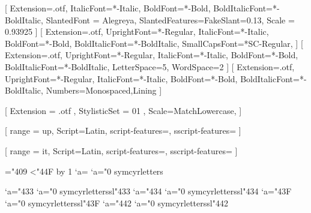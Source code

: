 % 
%


\setmainfont{Alegreya}[
  Extension=.otf,
  ItalicFont=*-Italic,
  BoldFont=*-Bold,
  BoldItalicFont=*-BoldItalic,
  SlantedFont = Alegreya,
  SlantedFeatures={FakeSlant=0.13},
  Scale = 0.93925
]
\setsansfont{AlegreyaSans}[
  Extension=.otf,
  UprightFont=*-Regular,
  ItalicFont=*-Italic,
  BoldFont=*-Bold,
  BoldItalicFont=*-BoldItalic,
  SmallCapsFont=*SC-Regular,
]
[
  Extension=.otf,
  UprightFont=*-Regular,
  ItalicFont=*-Italic,
  BoldFont=*-Bold,
  BoldItalicFont=*-BoldItalic,
  LetterSpace=5,
  WordSpace=2
]
[
  Extension=.otf,
  UprightFont=*-Regular,
  ItalicFont=*-Italic,
  BoldFont=*-Bold,
  BoldItalicFont=*-BoldItalic,
  Numbers={Monospaced,Lining}
]

% 
%

\usepackage{unicode-math}

[%
  Extension = .otf ,
  StylisticSet = 01 ,
  Scale=MatchLowercase,
]

[%
  range = {up},
  Script=Latin,
  script-features={},
  sscript-features={}
]

[%
  range = {it},
  Script=Latin,
  script-features={},
  sscript-features={}
]

\newcommand{\makecyrmathletter}[1]{%
  \begingroup\lccode`a=#1\lowercase{\endgroup
  \Umathcode`a}="0 \csname symcyrletters\endcsname\space #1
}
="409
\loop\ifnum{}<"44F
  \advance{} by 1
  \makecyrmathletter{\count255}
\repeat


\newcommand{\makecyrmathlettersl}[1]{%
  \begingroup\lccode`a=#1\lowercase{\endgroup
  \Umathcode`a}="0 \csname symcyrletterssl\endcsname\space #1
}
\makecyrmathlettersl{"433} %
\makecyrmathlettersl{"434} %
\makecyrmathlettersl{"43F} %
\makecyrmathlettersl{"442} %
